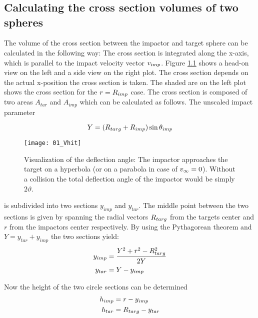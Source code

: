 \newpage
\graphicspath{{./07figs/}}

\chapter{}

\section{Calculating the cross section volumes of two spheres}
\label{ch07_sec01}
The volume of the cross section between the impactor and target sphere can be calculated in the following way: The cross section is integrated along the x-axis, which is parallel to the impact velocity vector $v_{imp}$. Figure \ref{ch07_fig01} shows a head-on view on the left and a side view on the right plot. The cross section depends on the actual x-position the cross section is taken. The shaded are on the left plot shows the cross section for the $r = R_{imp}$ case. The cross section is composed of two areas $A_{tar}$ and $A_{imp}$ which can be calculated as follows. The unscaled impact parameter 

\begin{equation}
\label{ch07_sec01_eq001}
Y = ( R_{targ} + R_{imp} ) \sin{ \theta_{imp}} 
\end{equation}

\begin{figure}[htbp]
\begin{center}
\texttt{[image: 01\_Vhit]}
\caption{Visualization of the deflection angle: The impactor approaches the target on a hyperbola (or on a parabola in case of $v_{\infty} = 0$). Without a collision the total deflection angle of the impactor would be simply $2 \vartheta$.}
\label{ch07_fig01}
\end{center}
\end{figure}

is subdivided into two sections $y_{imp}$ and $y_{tar}$. The middle point between the two sections is given by spanning the radial vectors $R_{targ}$ from the targets center and $r$ from the impactors center respectively.    By using the Pythagorean theorem and $Y = y_{tar} + y_{imp}$ the two sections yield:
\begin{align}
\label{ch07_sec01_eq002}
y_{imp} &= \frac{Y^2 + r^2 - R_{targ}^2}{2 Y} \\
y_{tar} &= Y - y_{imp}
\end{align}

Now the height of the two circle sections can be determined
\begin{align}
\label{ch07_sec01_eq003}
h_{imp} &= r - y_{imp}\\
h_{tar} &= R_{targ} - y_{tar} 
\end{align}

